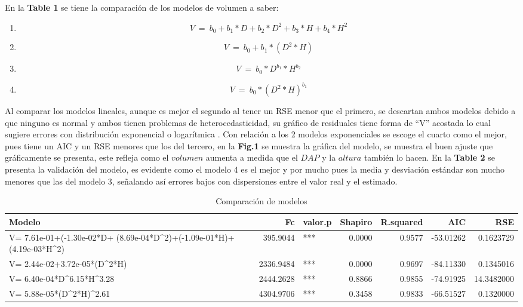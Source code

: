 \documentclass[9pt,onecolumn,twoside,]{pinp}
\providecommand{\tightlist}{%
  \setlength{\itemsep}{0pt}\setlength{\parskip}{0pt}}
\begin{document}
En la \textbf{Table 1} se tiene la comparación de los modelos de volumen
a saber:

\begin{enumerate}
\def\labelenumi{\arabic{enumi})}
\tightlist
\item
  \[V \ = \ b_0 + b_1*D+b_2*D^2+b_3*H+b_4*H^2\]
\item
  \[V \ = \ b_0+b_1*(D^2*H)\]
\item
  \[V \ = \ b_0 * D^{b_1}*H^{b_2}\]
\item
  \[V \ = \ b_0*(D^2*H)^{b_1}\]
\end{enumerate}

Al comparar los modelos lineales, aunque es mejor el segundo al tener un
RSE menor que el primero, se descartan ambos modelos debido a que
ninguno es normal y ambos tienen problemas de heterocedasticidad, su
gráfico de residuales tiene forma de ``V'' acostada lo cual sugiere
errores con distribución exponencial o logarítmica . Con relación a los
2 modelos exponenciales se escoge el cuarto como el mejor, pues tiene un
AIC y un RSE menores que los del tercero, en la \textbf{Fig.1} se
muestra la gráfica del modelo, se muestra el buen ajuste que
gráficamente se presenta, este refleja como el \(volumen\) aumenta a
medida que el \(DAP\) y la \(altura\) también lo hacen. En la
\textbf{Table 2} se presenta la validación del modelo, es evidente como
el modelo 4 es el mejor y por mucho pues la media y desviación estándar
son mucho menores que las del modelo 3, señalando así errores bajos con
dispersiones entre el valor real y el estimado.

\begin{table}[h!]

\caption{\label{tab:unnamed-chunk-9}Comparación de modelos}
\centering
\begin{tabular}[t]{l|r|l|r|r|r|r}
\hline
Modelo & Fc & valor.p & Shapiro & R.squared & AIC & RSE\\
\hline
V= 7.61e-01+(-1.30e-02*D+
               (8.69e-04*D\textasciicircum{}2)+(-1.09e-01*H)+
               (4.19e-03*H\textasciicircum{}2) & 395.9044 & *** & 0.0000 & 0.9577 & -53.01262 & 0.1623729\\
\hline
V= 2.44e-02+3.72e-05*(D\textasciicircum{}2*H) & 2336.9484 & *** & 0.0000 & 0.9697 & -84.11330 & 0.1345016\\
\hline
V= 6.40e-04*D\textasciicircum{}6.15*H\textasciicircum{}3.28 & 2444.2628 & *** & 0.8866 & 0.9855 & -74.91925 & 14.3482000\\
\hline
V= 5.88e-05*(D\textasciicircum{}2*H)\textasciicircum{}2.61 & 4304.9706 & *** & 0.3458 & 0.9833 & -66.51527 & 0.1320000\\
\hline
\end{tabular}
\end{table}
\end{document}
